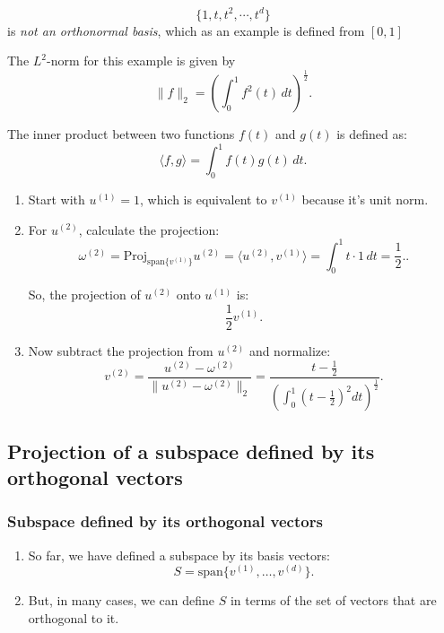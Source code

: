     \begin{example}
        \[
        \{1, t, t^2, \cdots, t^d\}
        \]
        is \textit{not an orthonormal basis}, which as an example is defined from $[0,1]$
        \vspace{1em}

        The \( L^2 \)-norm for this example is given by
        \[
        \|f\|_{2} = \left( \int_0^1 f^2(t) \, dt \right)^{\frac{1}{2}}.
        \]
        \vspace{1em}

        The inner product between two functions \( f(t) \) and \( g(t) \) is defined as:
        \[
        \langle f, g \rangle = \int_0^1 f(t) g(t) \, dt.
        \]

        \begin{enumerate}                
            \item Start with \( u^{(1)} = 1 \), which is equivalent to \( v^{(1)} \) because it's unit norm.
        
            \item For \( u^{(2)} \), calculate the projection:
            \[
            \omega^{(2)} = \text{Proj}_{\text{span}\{v^{(1)}\}} u^{(2)} = \langle u^{(2)}, v^{(1)} \rangle = \int_0^1 t \cdot 1 \, dt = \frac{1}{2}..
            \]
            
        
            So, the projection of \( u^{(2)} \) onto \( u^{(1)} \) is:
            \[
            \frac{1}{2} v^{(1)}.
            \]
            
            \item Now subtract the projection from \( u^{(2)} \) and normalize:
            \[
            v^{(2)} = \frac{u^{(2)} - \omega^{(2)}}{\|u^{(2)} - \omega^{(2)}\|_{2}} = \frac{t - \frac{1}{2}}{\left( \int_0^1 \left(t - \frac{1}{2}\right)^2 dt \right)^{\frac{1}{2}}}.
            \]
            
        \end{enumerate}
    \end{example}

\subsection{Projection of a subspace defined by its orthogonal vectors}
    \subsubsection{Subspace defined by its orthogonal vectors}
    \begin{intuition}
        \begin{enumerate}

            \item So far, we have defined a subspace by its basis vectors:
            \[
            S = \text{span}\{v^{(1)}, \dots, v^{(d)}\}.
            \]
            
            \item But, in many cases, we can define \( S \) in terms of the set of vectors that are orthogonal to it. 
        \end{enumerate}
    \end{intuition}
    
